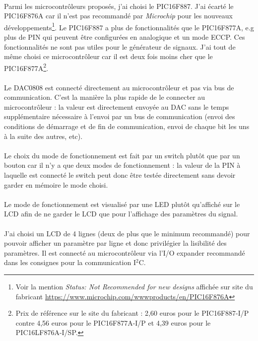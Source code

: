 \documentclass{article}
\begin{document}
    \paragraph{}
    Parmi les microcontrôleurs proposés, j'ai choisi le PIC16F887. J'ai écarté le PIC16F876A car il n'est pas recommandé par \emph{Microchip} pour les nouveaux développements\footnote{Voir la mention \emph{Status: Not Recommended for new designs} affichée sur site du fabricant \url{https://www.microchip.com/wwwproducts/en/PIC16F876A}}. Le PIC16F887 a plus de fonctionnalités que le PIC16F877A, e.g plus de PIN qui peuvent être configurées en analogique et un mode ECCP. Ces fonctionnalités ne sont pas utiles pour le générateur de signaux. J'ai tout de même choisi ce microcontrôleur car il est deux fois moins cher que le PIC16F877A\footnote{Prix de référence sur le site du fabricant : 2,60 euros pour le PIC16F887-I/P contre 4,56 euros pour le PIC16F877A-I/P et 4,39 euros pour le PIC16LF876A-I/SP.}.

    \paragraph{}
    Le DAC0808 est connecté directement au microcontrôleur et pas via bus de communication. C'est la manière la plus rapide de le connecter au microcontrôleur : la valeur est directement envoyée au DAC sans le temps supplémentaire nécessaire à l'envoi par un bus de communication (envoi des conditions de démarrage et de fin de communication, envoi de chaque bit les uns à la suite des autres, etc).

    \paragraph{}
    Le choix du mode de fonctionnement est fait par un switch plutôt que par un bouton car il n'y a que deux modes de fonctionnement : la valeur de la PIN à laquelle est connecté le switch peut donc être testée directement sans devoir garder en mémoire le mode choisi.

    \paragraph{}
    Le mode de fonctionnement est visualisé par une LED plutôt qu'affiché sur le LCD afin de ne garder le LCD que pour l'affichage des paramètres du signal.

    \paragraph{}
    J'ai choisi un LCD de 4 lignes (deux de plus que le minimum recommandé) pour pouvoir afficher un paramètre par ligne et donc privilégier la lisibilité des paramètres. Il est connecté au microcontrôleur via l'I/O expander recommandé dans les consignes pour la communication I$^2$C.
\end{document}
